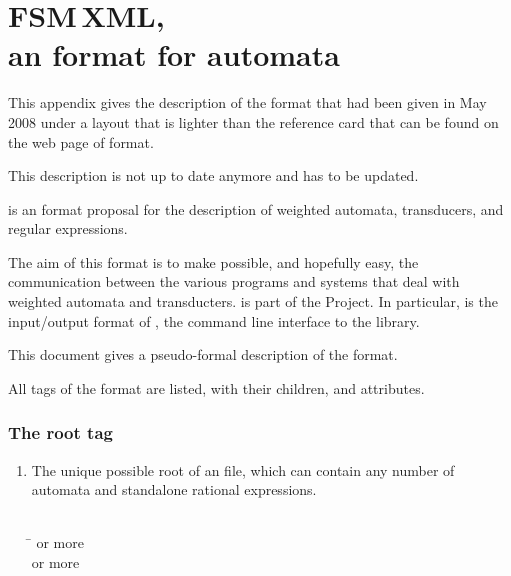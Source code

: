 
\chapter{{FSM\,XML}, \protect\\ \e an  format for automata}
\label{chp:fsm-xml}%

\newlength{\tagindentl}\newlength{\taglnskp}
\newlength{\tagspl}
\setlength{\tagindentl}{1.5em}
\setlength{\tagspl}{3em}
\setlength{\taglnskp}{-0.1ex}
\renewcommand\thesubsection{\arabic{subsection}}
\renewcommand\theenumii{\arabic{enumii}}
\renewcommand\theenumiii{\arabic{enumiii}}
\renewcommand\labelenumii{\theenumi.\theenumii.}
\renewcommand\labelenumiii{\theenumi.\theenumii.\theenumiii.}
\setcounter{subsection}{0}


\begin{Com}
    This appendix gives the description  of the 
    format \fsmxml that had been given in May 2008 under a layout 
    that is lighter than the reference card that can be found on the 
    web page of format.
    
    This description is not up to date anymore and has to be 
    updated.
\end{Com}

\fsmxml is an \xml format proposal for the description of 
weighted automata, transducers, and regular expressions.


The aim of this \xml format is to make possible, and hopefully easy,
the communication between the various programs and systems that deal
with weighted automata and transducters.  
\fsmxml is part of the \vcsn Project.  
In particular, \fsmxml is the
input/output format of \tafkit, the command line interface to the
\vcsn library.

This document gives a pseudo-formal description of the format.

All tags of the format are listed, with their children, and attributes.

\newpage 
\subsection{The root tag}
\begin{enumerate}%
\addtocounter{enumi}{-1}%

\item  {}

\smallskip
The unique possible root of an \fsmxml file, which can contain any 
number of automata and standalone rational expressions.

\begin{tabbing}
      \\[\taglnskp]
\tagindent{}\tagsp\= \kill
\tagindent{} or more \occ \\[\taglnskp]
\tagindent{}    or more \occ \\[\taglnskp]
\end{tabbing}



\end{enumerate}
\setcounter{enumitemp}{\value{enumi}}

